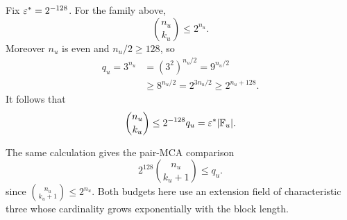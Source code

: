 Fix \(\varepsilon^\ast=2^{-128}\).  For the family above,
\[
  \binom{n_u}{k_u}\le 2^{n_u}.
\]
Moreover \(n_u\) is even and \(n_u/2\ge128\), so
\[
\begin{aligned}
  q_u=3^{n_u}
  &=(3^2)^{n_u/2}
    =9^{n_u/2} \\
  &\ge8^{n_u/2}
    =2^{3n_u/2}
    \ge2^{n_u+128}.
\end{aligned}
\]
It follows that
\[
  \binom{n_u}{k_u}
  \le 2^{-128}q_u
  =\varepsilon^\ast|\mathbb{F}_u|.
\]

The same calculation gives the pair-MCA comparison
\[
  2^{128}\binom{n_u}{k_u+1}\le q_u.
\]
since \(\binom{n_u}{k_u+1}\le2^{n_u}\). Both budgets here use an
extension field of characteristic three whose cardinality grows
exponentially with the block length.
